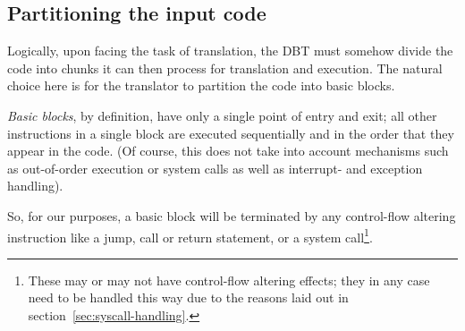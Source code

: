 \subsection{Partitioning the input code}
Logically, upon facing the task of translation, the DBT must somehow divide the code into chunks it can then process for translation and execution.
The natural choice here is for the translator to partition the code into basic blocks.

\textit{Basic blocks}, by definition, have only a single point of entry and exit;
all other instructions in a single block are executed sequentially and in the order that they appear in the code.
(Of course, this does not take into account mechanisms such as out-of-order execution or system calls as well as interrupt- and exception handling).

So, for our purposes, a basic block will be terminated by any control-flow altering instruction like a jump, call or return statement, or a system call\footnote{These may or may not have control-flow altering effects; they in any case need to be handled this way due to the reasons laid out in section~\ref{sec:syscall-handling}.}.








